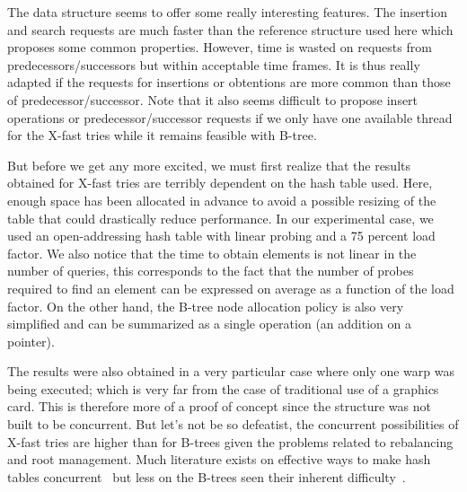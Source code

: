 The data structure seems to offer some really interesting features. The insertion and search requests are much faster than the reference structure used here which proposes some common properties. However, time is wasted on requests from predecessors/successors but within acceptable time frames. It is thus really adapted if the requests for insertions or obtentions are more common than those of predecessor/successor. Note that it also seems difficult to propose insert operations or predecessor/successor requests if we only have one available thread for the X-fast tries while it remains feasible with B-tree.

But before we get any more excited, we must first realize that the results obtained for X-fast tries are terribly dependent on the hash table used. Here, enough space has been allocated in advance to avoid a possible resizing of the table that could drastically reduce performance. In our experimental case, we used an open-addressing hash table with linear probing and a 75 percent load factor. We also notice that the time to obtain elements is not linear in the number of queries, this corresponds to the fact that the number of probes required to find an element can be expressed on average as a function of the load factor. On the other hand, the B-tree node allocation policy is also very simplified and can be summarized as a single operation (an addition on a pointer).

The results were also obtained in a very particular case where only one warp was being executed; which is very far from the case of traditional use of a graphics card. This is therefore more of a proof of concept since the structure was not built to be concurrent. But let's not be so defeatist, the concurrent possibilities of X-fast tries are higher than for B-trees given the problems related to rebalancing and root management. Much literature exists on effective ways to make hash tables concurrent~\cite{maier2016concurrent} but less on the B-trees seen their inherent difficulty~\cite{braginsky2012lock}.